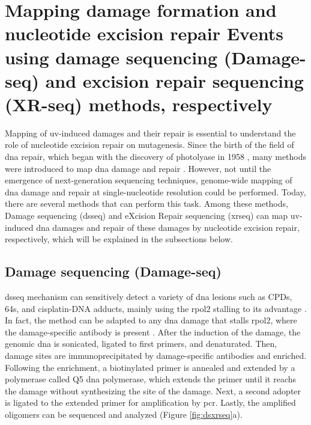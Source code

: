 \section{Mapping damage formation and nucleotide excision repair Events using damage sequencing (Damage-seq) and excision repair sequencing (XR-seq) methods, respectively}

Mapping of \gls{uv}-induced damages and their repair is essential to understand the role of nucleotide excision repair on mutagenesis. Since the birth of the field of \gls{dna} repair, which began with the discovery of photolyase in 1958 \citep{rupert1958photoreactivation,sancar2016mechanisms}, many methods were introduced to map \gls{dna} damage and repair \citep{li2020methodologies}. However, not until the emergence of next-generation sequencing techniques, genome-wide mapping of \gls{dna} damage and repair at single-nucleotide resolution could be performed. Today, there are several methods that can perform this task. Among these methods, Damage sequencing (\gls{dsseq}) and eXcision Repair sequencing (\gls{xrseq}) can map \gls{uv}-induced \gls{dna} damages and repair of these damages by nucleotide excision repair, respectively, which will be explained in the subsections below.

\subsection{Damage sequencing (Damage-seq)}

\gls{dsseq} mechanism can sensitively detect a variety of \gls{dna} lesions such as \gls{CPD}s, \gls{64}s, and cisplatin-DNA adducts, mainly using the \gls{rpol2} stalling to its advantage \citep{hu2016cisplatin}. In fact, the method can be adapted to any \gls{dna} damage that stalls \gls{rpol2}, where the damage-specific antibody is present \citep{sancar2016mechanisms}. After the induction of the damage, the genomic \gls{dna} is sonicated, ligated to first primers, and denaturated. Then, damage sites are immunoprecipitated by damage-specific antibodies and enriched. Following the enrichment, a biotinylated primer is annealed and extended by a polymerase called Q5 \gls{dna} polymerase, which extends the primer until it reachs the damage without synthesizing the site of the damage. Next, a second adopter is ligated to the extended primer for amplification by \gls{pcr}. Lastly, the amplified oligomers can be sequenced and analyzed (Figure \ref{fig:dsxrseq}a).      

